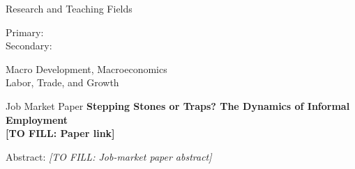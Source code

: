 \documentclass{resume} %
\begin{document}
	\begin{rSection}{Research and Teaching Fields}
		\begin{minipage}[t]{0.15\textwidth}
			Primary:\\
			Secondary:
		\end{minipage}
		\begin{minipage}[t]{0.85\textwidth}
				Macro Development, Macroeconomics\\
				Labor, Trade, and Growth
		\end{minipage}
	\end{rSection}

	\begin{rSection}{Job Market Paper}
			\textbf{Stepping Stones or Traps? The Dynamics of Informal Employment}\\
			\textbf{[TO FILL: Paper link]}

			Abstract: \textit{[TO FILL: Job-market paper abstract]}
	\end{rSection}

\end{document}
